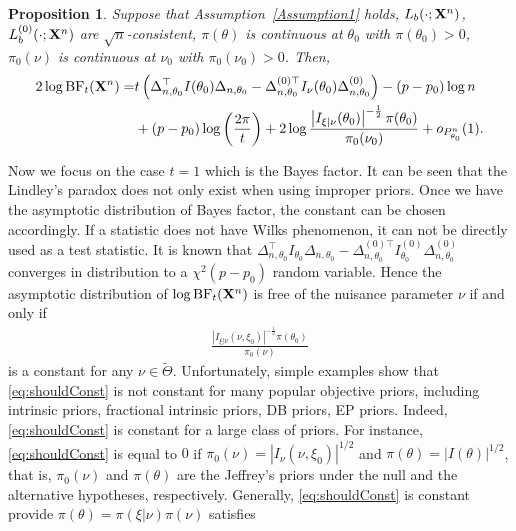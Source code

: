 \documentclass[11pt]{article}
\theoremstyle{plain}
\newtheorem{proposition}{\quad\quad Proposition}
\theoremstyle{definition}
\theoremstyle{remark}
\begin{document}
    \begin{proposition}
        Suppose that Assumption~\ref{Assumption1} holds, $L_{b}(\cdot;\mathbf{X}^{n})$, $L_{b}^{(0)}(\cdot;\mathbf{X}^{n})$ are $\sqrt{n}$-consistent, $\pi(\theta)$ is continuous at $\theta_0$ with $\pi(\theta_0)>0$, $\pi_0(\nu)$ is continuous at $\nu_0$ with $\pi_0(\nu_0)>0$.
        Then,
\begin{align*}
    2 \log \text{BF}_t (\mathbf{X}^{n})
    =&
    t \left( 
        \Delta_{n,\theta_0}^\top  I(\theta_0)\Delta_{n,\theta_0}
            -
            \Delta_{n,\theta_0}^{{(0)}\top} I_{\nu}(\theta_0)\Delta^{(0)}_{n,\theta_0}
        \right)
    -(p-p_0) \log n
    \\
    &+
    (p-p_0) \log \left( \frac{2\pi}{t} \right)
   +
   2 \log
       \frac{
           \left|I_{\xi|\nu}(\theta_0)\right|^{-\frac 1 2}\pi(\theta_0) 
   }{
    \pi_0(\nu_0)
}
    +o_{P^n_{\theta_0}}(1)
    .
\end{align*}
\label{prop:expansion}
    \end{proposition}
Now we focus on the case $t=1$ which is the Bayes factor.
It can be seen that the Lindley's paradox does not only exist when using improper priors.
Once we have the asymptotic distribution of Bayes factor, the constant can be chosen accordingly.
If a statistic does not have Wilks phenomenon, it can not be directly used as a test statistic.
It is known that $
\Delta_{n,\theta_0}^\top  I_{\theta_0}\Delta_{n,\theta_0}
            -
             \Delta_{n,\theta_0}^{{(0)}\top} I^{(0)}_{\theta_0}\Delta^{(0)}_{n,\theta_0}
$ converges in distribution to a $\chi^2(p-p_0)$ random variable.
Hence the asymptotic distribution of $\log \textrm{BF}_t (\mathbf{X}^n)$ is free of the nuisance parameter $\nu$ if and only if
\begin{align}\label{eq:shouldConst}
       \frac{
           \left|I_{\xi|\nu}(\nu, \xi_0)\right|^{-\frac 1 2}\pi(\theta_0) 
   }{
    \pi_0(\nu)
}
\end{align}
is a constant for any $\nu \in \tilde \Theta$.
Unfortunately, simple examples show that \eqref{eq:shouldConst} is not constant for many popular objective priors, including intrinsic priors, fractional intrinsic priors, DB priors, EP priors.
Indeed, \eqref{eq:shouldConst} is constant for a large class of priors.
For instance, \eqref{eq:shouldConst} is equal to $0$ if $\pi_0(\nu) = |I_{\nu}(\nu, \xi_0)|^{1/2}$ and $\pi(\theta) = | I (\theta)|^{1/2}$, that is, $\pi_0(\nu)$ and $\pi(\theta)$ are the Jeffrey's priors under the null and the alternative hypotheses, respectively.
Generally, \eqref{eq:shouldConst} is constant provide $\pi(\theta) = \pi (\xi |\nu) \pi(\nu)$ satisfies
\end{document}

